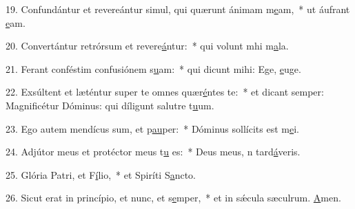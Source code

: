 19. Confundántur et revereántur simul, qui quærunt ánimam m\uline{e}am,~* ut áufrant \uline{e}am.\par 
20. Convertántur retrórsum et revere\uline{á}ntur:~* qui volunt mhi m\uline{a}la.\par 
21. Ferant conféstim confusiónem s\uline{u}am:~* qui dicunt mihi: Ege, \uline{e}uge.\par 
22. Exsúltent et læténtur super te omnes quær\uline{é}ntes te:~* et dicant semper: Magnificétur Dóminus: qui díligunt salutre t\uline{u}um.\par 
23. Ego autem mendícus sum, et p\uline{au}per:~* Dóminus sollícits est m\uline{e}i.\par 
24. Adjútor meus et protéctor meus t\uline{u} es:~* Deus meus, n tard\uline{á}veris.\par 
25. Glória Patri, et F\uline{í}lio,~* et Spiríti S\uline{a}ncto.\par 
26. Sicut erat in princípio, et nunc, et s\uline{e}mper,~* et in sǽcula sæculrum. \uline{A}men.\par 
